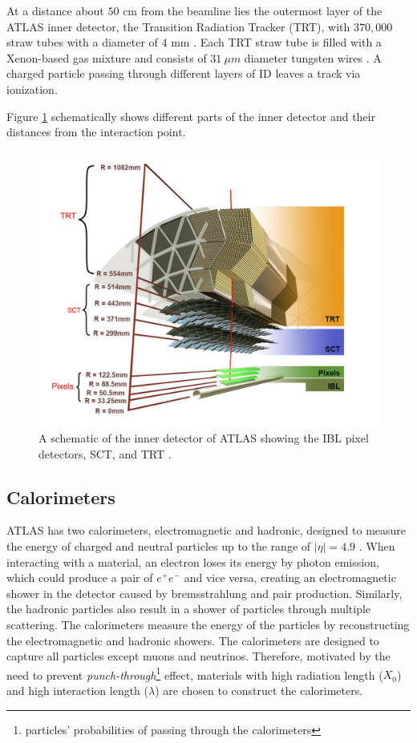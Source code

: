 At a distance about $50$ cm from the beamline lies the outermost layer of the ATLAS inner detector, the Transition Radiation Tracker (TRT), with $370,000$ straw tubes with a diameter of $4$ mm \cite{ID_TRT}. Each TRT straw tube is filled with a Xenon-based gas mixture and consists of $31~\mu m$ diameter tungsten wires \cite{ID_TRT}. A charged particle passing through different layers of ID leaves a track via ionization. 

Figure \ref{fig:ATLAS_ID} schematically shows different parts of the inner detector and their distances from the interaction point.

\begin{figure}
    \centering
    \includegraphics[width=.98\linewidth]{figures/LHC/ATLAS_InnerDetector.jpg}
    \caption{ A schematic of the inner detector of ATLAS showing the IBL pixel detectors, SCT, and TRT \cite{ID_Align_Run2}.\label{fig:ATLAS_ID}}
\end{figure}

\subsection{Calorimeters}
\label{subsec:Cal}

ATLAS has two calorimeters, electromagnetic and hadronic, designed to measure the energy of charged and neutral particles up to the range of $|\eta|=4.9$ \cite{ATLAS}. When interacting with a material, an electron loses its energy by photon emission, which could produce a pair of $e^{+}e^{-}$ and vice versa, creating an electromagnetic shower in the detector caused by bremsstrahlung and pair production. Similarly, the hadronic particles also result in a shower of particles through multiple scattering. The calorimeters measure the energy of the particles by reconstructing the electromagnetic and hadronic showers. The calorimeters are designed to capture all particles except muons and neutrinos. Therefore, motivated by the need to prevent \textit{punch-through}\footnote{particles' probabilities of passing through the calorimeters} effect, materials with high radiation length ($X_{0}$) and high interaction length ($\lambda$) are chosen to construct the calorimeters.

